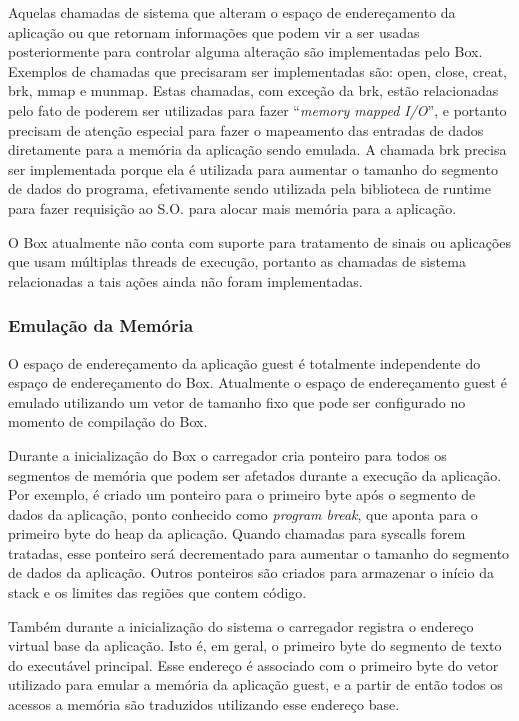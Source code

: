 \documentclass[11pt,twoside]{article}
\begin{document}
Aquelas chamadas de sistema que alteram o espaço de endereçamento da aplicação
ou que retornam informações que podem vir a ser usadas posteriormente para
controlar alguma alteração são implementadas pelo Box.  Exemplos de chamadas que
precisaram ser implementadas são: open, close, creat, brk, mmap e munmap. Estas
chamadas, com exceção da brk, estão relacionadas pelo fato de poderem ser
utilizadas para fazer ``\emph{memory mapped I/O}'', e portanto precisam de atenção
especial para fazer o mapeamento das entradas de dados diretamente para a
memória da aplicação sendo emulada. A chamada brk precisa ser implementada
porque ela é utilizada para aumentar o tamanho do segmento de dados do programa,
efetivamente sendo utilizada pela biblioteca de runtime para fazer requisição ao
S.O. para alocar mais memória para a aplicação.

O Box atualmente não conta com suporte para tratamento de sinais ou aplicações
que usam múltiplas threads de execução, portanto as chamadas de sistema
relacionadas a tais ações ainda não foram implementadas.

\subsubsection{Emulação da Memória}

O espaço de endereçamento da aplicação guest é totalmente independente do espaço
de endereçamento do Box. Atualmente o espaço de endereçamento guest é emulado
utilizando um vetor de tamanho fixo que pode ser configurado no momento de
compilação do Box.

Durante a inicialização do Box o carregador cria ponteiro para todos os
segmentos de memória que podem ser afetados durante a execução da aplicação.
Por exemplo, é criado um ponteiro para o primeiro byte após o segmento de dados
da aplicação, ponto conhecido como \emph{program break}, que aponta
para o primeiro byte do heap da aplicação. Quando chamadas para syscalls forem
tratadas, esse ponteiro será decrementado para aumentar o tamanho do segmento de
dados da aplicação. Outros ponteiros são criados para armazenar o início da
stack e os limites das regiões que contem código.

Também durante a inicialização do sistema o carregador registra o endereço
virtual base da aplicação. Isto é, em geral, o primeiro byte do segmento de
texto do executável principal. Esse endereço é associado com o primeiro byte do
vetor utilizado para emular a memória da aplicação guest, e a partir de então
todos os acessos a memória são traduzidos utilizando esse endereço base.
\end{document}
